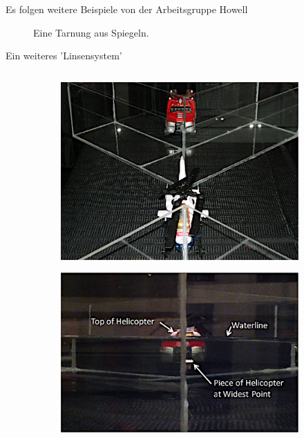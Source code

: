 \begin{frame}{Es folgen weitere Beispiele von der Arbeitsgruppe Howell}
\begin{figure}
\begin{subfigure}{0.48\textwidth}
        \end{subfigure}
        \caption{Eine Tarnung aus Spiegeln.}
    \end{figure}
\end{frame}

\begin{frame}{Ein weiteres 'Linsensystem'}
    \begin{columns}
        \begin{column}{0.48\textwidth}
            \begin{figure}
                \centering
                \begin{subfigure}{\textwidth}
                    \centering
                    \includegraphics[height=0.4\textheight]{images/fresnel-oben.png}
                \end{subfigure}
                \begin{subfigure}{\textwidth}
                    \centering
                    \includegraphics[height=0.4\textheight]{images/fresnel-vorne.png}

\end{subfigure}
\end{figure}
\end{column}
\end{columns}
\end{frame}
